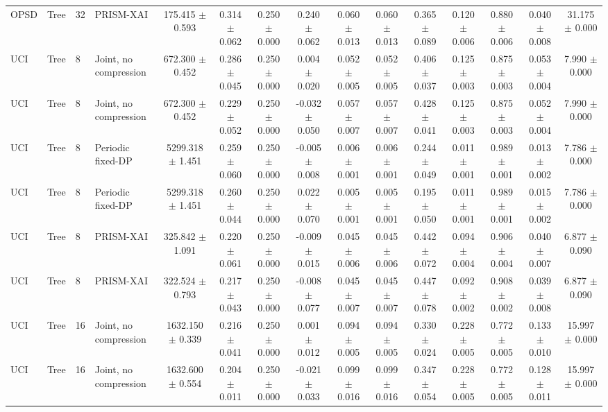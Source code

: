 \begin{tabular}{llllccccccccccc}
OPSD & Tree & 32 & PRISM-XAI & 175.415 $\pm$ 0.593 & 0.314 $\pm$ 0.062 & 0.250 $\pm$ 0.000 & 0.240 $\pm$ 0.062 & 0.060 $\pm$ 0.013 & 0.060 $\pm$ 0.013 & 0.365 $\pm$ 0.089 & 0.120 $\pm$ 0.006 & 0.880 $\pm$ 0.006 & 0.040 $\pm$ 0.008 & 31.175 $\pm$ 0.000 \\
UCI & Tree & 8 & Joint, no compression & 672.300 $\pm$ 0.452 & 0.286 $\pm$ 0.045 & 0.250 $\pm$ 0.000 & 0.004 $\pm$ 0.020 & 0.052 $\pm$ 0.005 & 0.052 $\pm$ 0.005 & 0.406 $\pm$ 0.037 & 0.125 $\pm$ 0.003 & 0.875 $\pm$ 0.003 & 0.053 $\pm$ 0.004 & 7.990 $\pm$ 0.000 \\
UCI & Tree & 8 & Joint, no compression & 672.300 $\pm$ 0.452 & 0.229 $\pm$ 0.052 & 0.250 $\pm$ 0.000 & -0.032 $\pm$ 0.050 & 0.057 $\pm$ 0.007 & 0.057 $\pm$ 0.007 & 0.428 $\pm$ 0.041 & 0.125 $\pm$ 0.003 & 0.875 $\pm$ 0.003 & 0.052 $\pm$ 0.004 & 7.990 $\pm$ 0.000 \\
UCI & Tree & 8 & Periodic fixed-DP & 5299.318 $\pm$ 1.451 & 0.259 $\pm$ 0.060 & 0.250 $\pm$ 0.000 & -0.005 $\pm$ 0.008 & 0.006 $\pm$ 0.001 & 0.006 $\pm$ 0.001 & 0.244 $\pm$ 0.049 & 0.011 $\pm$ 0.001 & 0.989 $\pm$ 0.001 & 0.013 $\pm$ 0.002 & 7.786 $\pm$ 0.000 \\
UCI & Tree & 8 & Periodic fixed-DP & 5299.318 $\pm$ 1.451 & 0.260 $\pm$ 0.044 & 0.250 $\pm$ 0.000 & 0.022 $\pm$ 0.070 & 0.005 $\pm$ 0.001 & 0.005 $\pm$ 0.001 & 0.195 $\pm$ 0.050 & 0.011 $\pm$ 0.001 & 0.989 $\pm$ 0.001 & 0.015 $\pm$ 0.002 & 7.786 $\pm$ 0.000 \\
UCI & Tree & 8 & PRISM-XAI & 325.842 $\pm$ 1.091 & 0.220 $\pm$ 0.061 & 0.250 $\pm$ 0.000 & -0.009 $\pm$ 0.015 & 0.045 $\pm$ 0.006 & 0.045 $\pm$ 0.006 & 0.442 $\pm$ 0.072 & 0.094 $\pm$ 0.004 & 0.906 $\pm$ 0.004 & 0.040 $\pm$ 0.007 & 6.877 $\pm$ 0.090 \\
UCI & Tree & 8 & PRISM-XAI & 322.524 $\pm$ 0.793 & 0.217 $\pm$ 0.043 & 0.250 $\pm$ 0.000 & -0.008 $\pm$ 0.077 & 0.045 $\pm$ 0.007 & 0.045 $\pm$ 0.007 & 0.447 $\pm$ 0.078 & 0.092 $\pm$ 0.002 & 0.908 $\pm$ 0.002 & 0.039 $\pm$ 0.008 & 6.877 $\pm$ 0.090 \\
UCI & Tree & 16 & Joint, no compression & 1632.150 $\pm$ 0.339 & 0.216 $\pm$ 0.041 & 0.250 $\pm$ 0.000 & 0.001 $\pm$ 0.012 & 0.094 $\pm$ 0.005 & 0.094 $\pm$ 0.005 & 0.330 $\pm$ 0.024 & 0.228 $\pm$ 0.005 & 0.772 $\pm$ 0.005 & 0.133 $\pm$ 0.010 & 15.997 $\pm$ 0.000 \\
UCI & Tree & 16 & Joint, no compression & 1632.600 $\pm$ 0.554 & 0.204 $\pm$ 0.011 & 0.250 $\pm$ 0.000 & -0.021 $\pm$ 0.033 & 0.099 $\pm$ 0.016 & 0.099 $\pm$ 0.016 & 0.347 $\pm$ 0.054 & 0.228 $\pm$ 0.005 & 0.772 $\pm$ 0.005 & 0.128 $\pm$ 0.011 & 15.997 $\pm$ 0.000 \\

\end{tabular}

